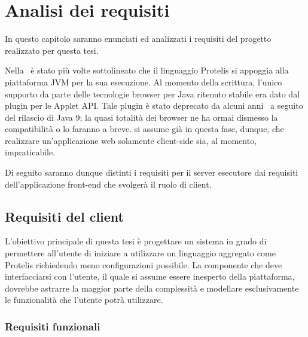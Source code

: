 \chapter{Analisi dei requisiti}\label{ch:requirements}
  In questo capitolo saranno enunciati ed analizzati i requisiti del progetto realizzato per questa tesi.

  Nella~ è stato più volte sottolineato che il linguaggio Protelis si appoggia alla piattaforma JVM per la sua esecuzione.
  Al momento della scrittura, l'unico supporto da parte delle tecnologie browser per Java ritenuto stabile era dato dal plugin per le Applet API\@.
  Tale plugin è stato deprecato da alcuni anni~\cite{jep289} a seguito del rilascio di Java 9;
  la quasi totalità dei browser ne ha ormai dismesso la compatibilità o lo faranno a breve.
  si assume già in questa fase, dunque, che realizzare un'applicazione web solamente client-side sia, al momento, impraticabile.

  Di seguito saranno dunque distinti i requisiti per il server esecutore dai requisiti dell'applicazione front-end che svolgerà il ruolo di client.

  \section{Requisiti del client}
    L'obiettivo principale di questa tesi è progettare un sistema in grado di permettere all'utente di iniziare a utilizzare un linguaggio aggregato come Protelis richiedendo meno configurazioni possibile.
    La componente che deve interfacciarsi con l'utente, il quale si assume essere inesperto della piattaforma, dovrebbe astrarre la maggior parte della complessità e modellare esclusivamente le funzionalità che l'utente potrà utilizzare.

    \subsection{Requisiti funzionali}

